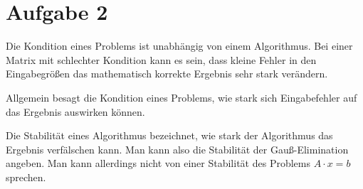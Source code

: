 \section*{Aufgabe 2}

Die Kondition eines Problems ist unabhängig von einem Algorithmus. Bei einer Matrix mit schlechter Kondition kann es sein, dass kleine Fehler in den Eingabegrößen das mathematisch korrekte Ergebnis sehr stark verändern.

Allgemein besagt die Kondition eines Problems, wie stark sich Eingabefehler auf das Ergebnis auswirken können.

Die Stabilität eines Algorithmus bezeichnet, wie stark der Algorithmus das Ergebnis verfälschen kann. Man kann also die Stabilität der Gauß-Elimination angeben. Man kann allerdings nicht von einer Stabilität des Problems $A \cdot x = b$ sprechen.
